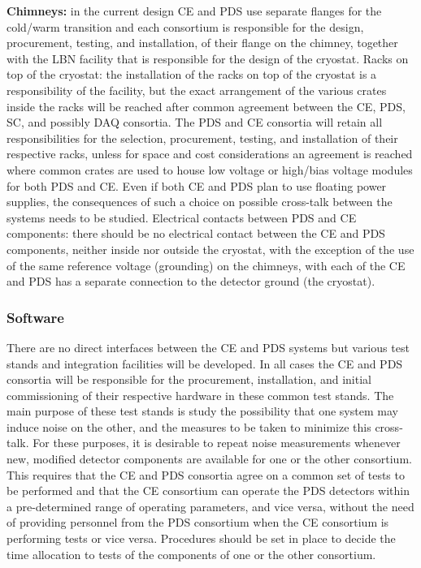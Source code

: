\textbf{Chimneys: }in the current design CE and PDS use separate flanges for the cold/warm transition and each consortium is responsible for the design, procurement, testing, and installation, of their flange on the chimney, together with the LBN facility that is responsible for the design of the cryostat.
Racks on top of the cryostat: the installation of the racks on top of the cryostat is a responsibility of the facility, but the exact arrangement of the various crates inside the racks will be reached after common agreement between the CE, PDS, SC, and possibly DAQ consortia. The PDS and CE consortia will retain all responsibilities for the selection, procurement, testing, and installation of their respective racks, unless for space and cost considerations an agreement is reached where common crates are used to house low voltage or high/bias voltage modules for both PDS and CE. Even if both CE and PDS plan to use floating power supplies, the consequences of such a choice on possible cross-talk between the systems needs to be studied. 
Electrical contacts between PDS and CE components: there should be no electrical contact between the CE and PDS components, neither inside nor outside the cryostat, with the exception of the use of the same reference voltage (grounding) on the chimneys, with each of the CE and PDS has a separate connection to the detector ground (the cryostat).

\subsubsection{Software}
There are no direct interfaces between the CE and PDS systems but various test stands and integration facilities will be developed. In all cases the CE and PDS consortia will be responsible for the procurement, installation, and initial commissioning of their respective hardware in these common test stands. The main purpose of these test stands is study the possibility that one system may induce noise on the other, and the measures to be taken to minimize this cross-talk. For these purposes, it is desirable to repeat noise measurements whenever new, modified detector components are available for one or the other consortium. This requires that the CE and PDS consortia agree on a common set of tests to be performed and that the CE consortium can operate the PDS detectors within a pre-determined range of operating parameters, and vice versa, without the need of providing personnel from the PDS consortium when the CE consortium is performing tests or vice versa. Procedures should be set in place to decide the time allocation to tests of the components of one or the other consortium.

